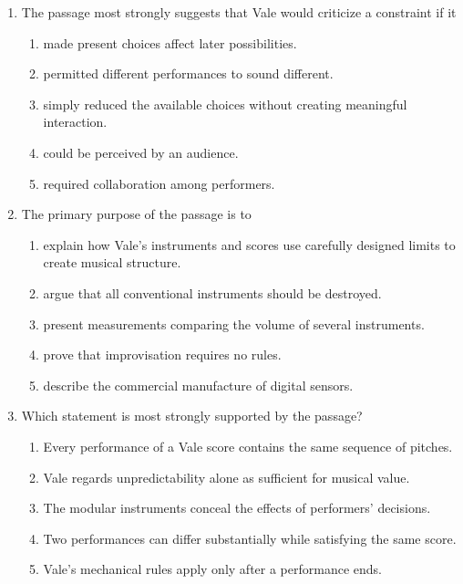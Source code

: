 \begin{enumerate}
\item The passage most strongly suggests that Vale would criticize a constraint if it
  \begin{enumerate}
  \item made present choices affect later possibilities.
  \item permitted different performances to sound different.
  \item simply reduced the available choices without creating meaningful interaction.
  \item could be perceived by an audience.
  \item required collaboration among performers.
  \end{enumerate}

\item The primary purpose of the passage is to
  \begin{enumerate}
  \item explain how Vale's instruments and scores use carefully designed limits to
        create musical structure.
  \item argue that all conventional instruments should be destroyed.
  \item present measurements comparing the volume of several instruments.
  \item prove that improvisation requires no rules.
  \item describe the commercial manufacture of digital sensors.
  \end{enumerate}

\item Which statement is most strongly supported by the passage?
  \begin{enumerate}
  \item Every performance of a Vale score contains the same sequence of pitches.
  \item Vale regards unpredictability alone as sufficient for musical value.
  \item The modular instruments conceal the effects of performers' decisions.
  \item Two performances can differ substantially while satisfying the same score.
  \item Vale's mechanical rules apply only after a performance ends.
  \end{enumerate}
\end{enumerate}

